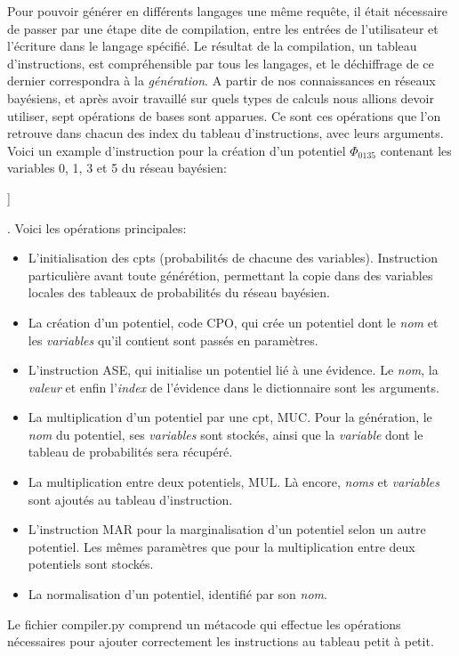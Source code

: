 \documentclass[a4paper]{article}
\begin{document}
Pour pouvoir générer en différents langages une même requête, il était nécessaire de passer par une étape dite de compilation, entre les entrées de l'utilisateur et l'écriture dans le langage
spécifié. Le résultat de la compilation, un tableau d'instructions, est compréhensible par tous les langages, et le déchiffrage de ce dernier correspondra à la \textit{génération}. A partir de nos connaissances
en réseaux bayésiens, et après avoir travaillé sur quels types de calculs nous allions devoir utiliser, sept opérations de bases sont apparues. Ce sont ces opérations que l'on retrouve dans chacun des index
du tableau d'instructions, avec leurs arguments. Voici un example d'instruction pour la création d'un potentiel $\Phi_{0 1 3 5}$ contenant les variables 0, 1, 3 et 5 du réseau bayésien:
\begin{snugshade} [ 'CPO', $'Phi-0-1-3-5'$, [0,1,3,5] ]  \end{snugshade}. Voici les opérations principales:
\begin{itemize}
 \item L'initialisation des cpts (probabilités de chacune des variables). Instruction particulière avant toute générétion, permettant la copie dans des variables locales des tableaux de probabilités 
 du réseau bayésien.
 \item La création d'un potentiel, code CPO, qui crée un potentiel dont le \textit{nom} et les \textit{variables} qu'il contient sont passés en paramètres.
 \item L'instruction ASE, qui initialise un potentiel lié à une évidence. Le \textit{nom}, la \textit{valeur} et enfin l'\textit{index} de l'évidence dans le dictionnaire sont les arguments.
 \item La multiplication d'un potentiel par une cpt, MUC. Pour la génération, le \textit{nom} du potentiel, ses \textit{variables} sont stockés, ainsi que la \textit{variable} dont le tableau de probabilités
 sera récupéré.
 \item La multiplication entre deux potentiels, MUL. Là encore, \textit{noms} et \textit{variables} sont ajoutés au tableau d'instruction.
 \item L'instruction MAR pour la marginalisation d'un potentiel selon un autre potentiel. Les mêmes paramètres que pour la multiplication entre deux potentiels sont stockés.
 \item La normalisation d'un potentiel, identifié par son \textit{nom}.
\end{itemize}
Le fichier compiler.py comprend un métacode qui effectue les opérations nécessaires pour ajouter correctement les instructions au tableau petit à petit. 
\end{document}
